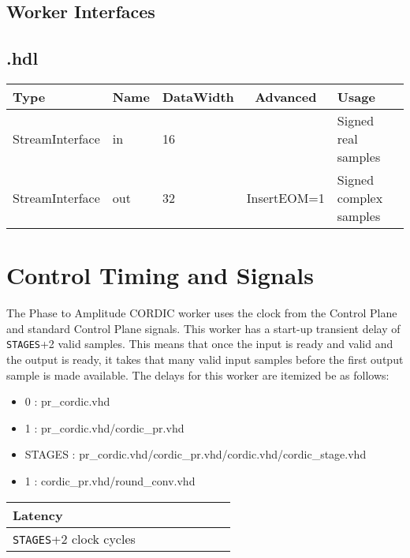\begin{landscape}
\section*{Worker Interfaces}
\subsection*{\comp.hdl}
\begin{scriptsize}
	\begin{tabular}{|M{2cm}|M{1.5cm}|M{4cm}|c|M{10cm}|}
		\hline
		Type            & Name & DataWidth & Advanced                & Usage                  \\
		\hline
		StreamInterface & in   & 16        & & Signed real samples    \\
		\hline
		StreamInterface & out  & 32        & InsertEOM=1 & Signed complex samples \\
		\hline
	\end{tabular}
\end{scriptsize}
\end{landscape}

\section*{Control Timing and Signals}
The Phase to Amplitude CORDIC worker uses the clock from the Control Plane and standard Control Plane signals. This worker has a start-up transient delay of \verb+STAGES++2 valid samples. This means that once the input is ready and valid and the output is ready, it takes that many valid input samples before the first output sample is made available. The delays for this worker are itemized be as follows:
\begin{itemize}
	\item 0 : pr\_cordic.vhd
	\item 1 : pr\_cordic.vhd/cordic\_pr.vhd
	\item STAGES : pr\_cordic.vhd/cordic\_pr.vhd/cordic.vhd/cordic\_stage.vhd 
	\item 1 : cordic\_pr.vhd/round\_conv.vhd
\end{itemize}

\begin{tabular}{|M{4.5cm}|M{1cm}|M{1cm}|M{1.5cm}|M{2cm}|M{1cm}|M{1cm}|M{2.5cm}|}
	\hline
	Latency                      \\
	\hline
	\verb+STAGES++2 clock cycles \\
	\hline
\end{tabular}

